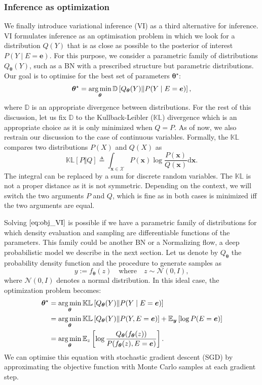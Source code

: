 \subsubsection{Inference as optimization}
We finally introduce variational inference (VI) as a third alternative for inference. VI formulates inference as an optimisation problem in which we look for a distribution $Q(Y)$ that is as close as possible to the posterior of interest $P(Y\mid E=\bm{e})$. For this purpose, we consider a parametric family of distributions $Q_{\bm{\theta}}(Y)$, such as a BN with a prescribed structure but parametric distributions. Our goal is to optimise for the best set of parameters $\bm{\theta}^\star$:
\begin{align}
  \bm{\theta}^\star = \operatorname*{arg\,min}_{\bm{\theta}} \mathbb{D}\left[Q_{\bm{\theta}}(Y)\Vert P(Y\mid E=\bm{e}) \right], \label{eq:obj_VI}
\end{align}
where $\mathbb{D}$ is an appropriate divergence between distributions. For the rest of this discussion, let us fix $\mathbb{D}$ to the Kullback-Leibler ($\mathbb{KL}$) divergence which is an appropriate choice as it is only minimized when $Q = P$. As of now, we also restrain our discussion to the case of continuous variables. Formally, the $\mathbb{KL}$ compares two distributions $P(X)$ and $Q(X)$ as $$\mathbb{KL}\left[P\Vert Q\right] \triangleq \int_{\bm{x} \in \mathcal{X}} P(\bm{x}) \log \frac{P(\bm{x})}{Q(\bm{x})} \text{d}\bm{x}.$$ The integral can be replaced by a sum for discrete random variables. The $\mathbb{KL}$ is not a proper distance as it is not symmetric. Depending on the context, we will switch the two arguments $P$ and $Q$, which is fine as in both cases  is minimized iff the two arguments are equal.

Solving $\Cref{eq:obj_VI}$ is possible if we have a parametric family of distributions for which density evaluation and sampling are differentiable functions of the parameters. This family could be another BN or a Normalizing flow, a deep probabilistic model we describe in the next section. Let us denote by $Q_{\bm{\theta}}$ the probability density function and the procedure to generate samples as $$ y := f_{\bm{\theta}}(z) \quad\text{where}\quad z\sim \mathcal{N}(0, I),$$
where $\mathcal{N}(0, I)$ denotes a normal distribution.
In this ideal case, the optimization problem becomes:
\begin{align}
  \bm{\theta}^\star &= \operatorname*{arg\,min}_{\bm{\theta}} \mathbb{KL}\left[Q_{\bm{\theta}}(Y)\Vert P(Y\mid E=\bm{e}) \right]\\ \label{eq:VI_optim}
  &= \operatorname*{arg\,min}_{\bm{\theta}} \mathbb{KL}\left[Q_{\bm{\theta}}(Y)\Vert P(Y, E=\bm{e}) \right] + \mathbb{E}_{\bm y}\left[\log P(E=\bm{e})\right]\\
  &= \operatorname*{arg\,min}_{\bm{\theta}} \mathbb{E}_{z}\left[ \log \frac{Q_{\bm{\theta}}(f_{\bm{\theta}}(z))}{P(f_{\bm{\theta}}(z), E=\bm{e})} \right].
\end{align}
We can optimise this equation with stochastic gradient descent (SGD) by approximating the objective function with Monte Carlo samples at each gradient step.

